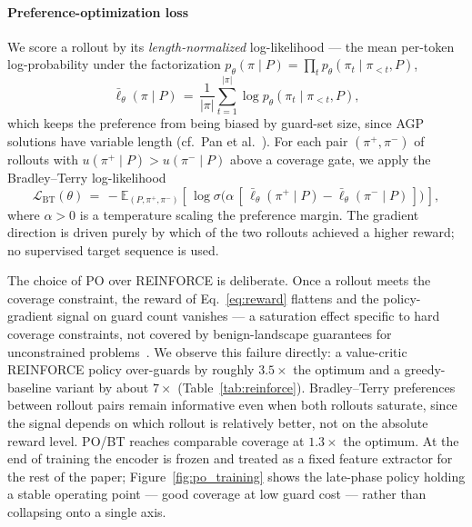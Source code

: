 \documentclass[preprint,10pt]{elsarticle}
\begin{document}
\paragraph{Preference-optimization loss} We score a rollout by its \emph{length-normalized} log-likelihood --- the mean per-token log-probability under the factorization $p_\theta(\pi \mid P) = \prod_t p_\theta(\pi_t \mid \pi_{<t}, P)$,
\begin{equation}
\bar{\ell}_\theta(\pi \mid P) \,=\, \frac{1}{|\pi|} \sum_{t=1}^{|\pi|} \log p_\theta(\pi_t \mid \pi_{<t}, P),
\label{eq:lognorm}
\end{equation}
which keeps the preference from being biased by guard-set size, since AGP solutions have variable length (cf.\ Pan et al.~\cite{Pan2025PO}). For each pair $(\pi^+, \pi^-)$ of rollouts with $u(\pi^+ \mid P) > u(\pi^- \mid P)$ above a coverage gate, we apply the Bradley--Terry log-likelihood
\begin{equation}
\mathcal{L}_{\mathrm{BT}}(\theta) \,=\, -\mathbb{E}_{(P, \pi^+, \pi^-)} \left[\, \log \sigma\!\big( \alpha\, [\, \bar{\ell}_\theta(\pi^+ \mid P) - \bar{\ell}_\theta(\pi^- \mid P)\, ] \big) \,\right],
\label{eq:bt-loss}
\end{equation}
where $\alpha > 0$ is a temperature scaling the preference margin. The gradient direction is driven purely by which of the two rollouts achieved a higher reward; no supervised target sequence is used.

The choice of PO over REINFORCE is deliberate. Once a rollout meets the coverage constraint, the reward of Eq.~\eqref{eq:reward} flattens and the policy-gradient signal on guard count vanishes --- a saturation effect specific to hard coverage constraints, not covered by benign-landscape guarantees for unconstrained problems~\cite{Caramanis2023Landscape}. We observe this failure directly: a value-critic REINFORCE policy over-guards by roughly $3.5\times$ the optimum and a greedy-baseline variant by about $7\times$ (Table~\ref{tab:reinforce}). Bradley--Terry preferences between rollout pairs remain informative even when both rollouts saturate, since the signal depends on which rollout is relatively better, not on the absolute reward level. PO/BT reaches comparable coverage at $1.3\times$ the optimum. At the end of training the encoder is frozen and treated as a fixed feature extractor for the rest of the paper; Figure~\ref{fig:po_training} shows the late-phase policy holding a stable operating point --- good coverage at low guard cost --- rather than collapsing onto a single axis.
\end{document}

